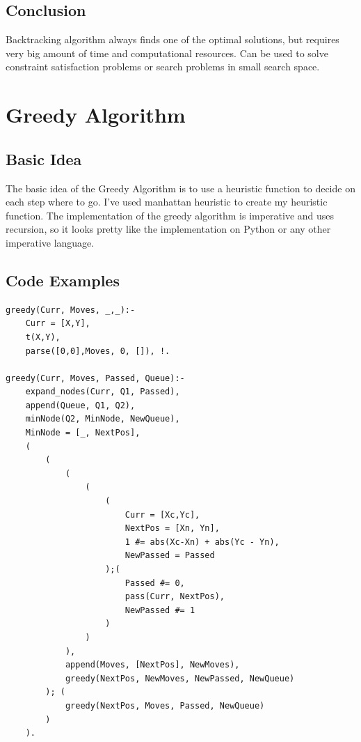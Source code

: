 \documentclass[a4apper,11pt]{article}
\begin{document}
\subsection{Conclusion}
Backtracking algorithm always finds one of the optimal solutions, but requires very big amount of time and computational resources. Can be used to solve constraint satisfaction problems or search problems in small search space.

\newpage
\section{Greedy Algorithm}
\subsection{Basic Idea}

The basic idea of the Greedy Algorithm is to use a heuristic function to decide on each step where to go. I've used manhattan heuristic to create my heuristic function. The implementation of the greedy algorithm is imperative and uses recursion, so it looks pretty like the implementation on Python or any other imperative language.

\subsection{Code Examples}

\begin{lstlisting}[caption={Main Greedy Predicate.}, label={greedy:base}]
greedy(Curr, Moves, _,_):-
	Curr = [X,Y],
    t(X,Y),
    parse([0,0],Moves, 0, []), !.

greedy(Curr, Moves, Passed, Queue):-
	expand_nodes(Curr, Q1, Passed),
    append(Queue, Q1, Q2),
    minNode(Q2, MinNode, NewQueue),
    MinNode = [_, NextPos],
    (
        (
            (
                (
                    (
                        Curr = [Xc,Yc],
                        NextPos = [Xn, Yn],
                        1 #= abs(Xc-Xn) + abs(Yc - Yn),
                        NewPassed = Passed
                    );(
                        Passed #= 0,
                        pass(Curr, NextPos),
                        NewPassed #= 1
                    )
                )
            ),
            append(Moves, [NextPos], NewMoves),
            greedy(NextPos, NewMoves, NewPassed, NewQueue)
        ); (
            greedy(NextPos, Moves, Passed, NewQueue)
        )
    ).
\end{lstlisting}
    
\end{document}
